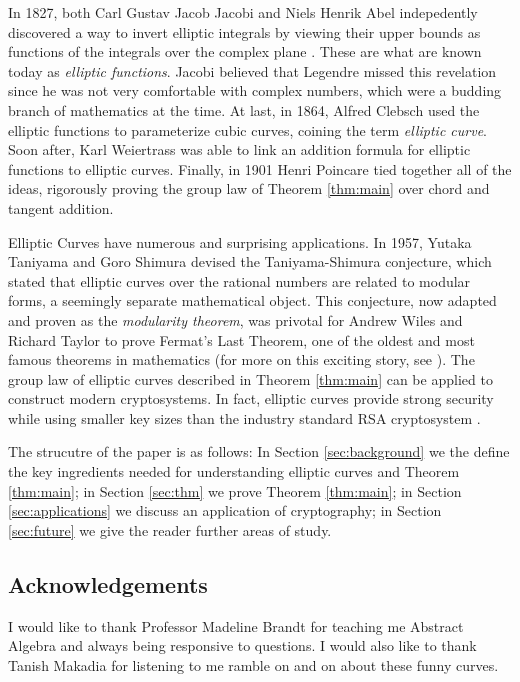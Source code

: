 \documentclass[]{../../math_paper}
\begin{document}
In 1827, both Carl Gustav Jacob Jacobi and Niels Henrik Abel indepedently discovered a way to invert elliptic integrals by viewing their upper bounds as functions of the integrals over the complex plane\cite{jacobi1829fundamenta} \cite{abel}. These are what are known today as \emph{elliptic functions}. Jacobi believed that Legendre missed this revelation since he was not very comfortable with complex numbers, which were a budding branch of mathematics at the time. At last, in 1864, Alfred Clebsch used the elliptic functions to parameterize cubic curves, coining the term \emph{elliptic curve}. Soon after, Karl Weiertrass was able to link an addition formula for elliptic functions to elliptic curves. Finally, in 1901 Henri Poincare tied together all of the ideas, rigorously proving the group law of Theorem \ref{thm:main} over chord and tangent addition\cite{H1901}.

Elliptic Curves have numerous and surprising applications. In 1957, Yutaka Taniyama and Goro Shimura devised the Taniyama-Shimura conjecture, which stated that elliptic curves over the rational numbers are related to modular forms, a seemingly separate mathematical object. This conjecture, now adapted and proven as the \emph{modularity theorem}, was privotal for Andrew Wiles and Richard Taylor to prove Fermat's Last Theorem, one of the oldest and most famous theorems in mathematics (for more on this exciting story, see \cite{singh1998fermat}). The group law of elliptic curves described in Theorem \ref{thm:main} can be applied to construct modern cryptosystems. In fact, elliptic curves provide strong security while using smaller key sizes than the industry standard RSA cryptosystem \cite{stein2008elementary}.

The strucutre of the paper is as follows: In Section \ref{sec:background} we the define the key ingredients needed for understanding elliptic curves and Theorem \ref{thm:main}; in Section \ref{sec:thm} we prove Theorem \ref{thm:main}; in Section \ref{sec:applications} we discuss an application of cryptography; in Section \ref{sec:future} we give the reader further areas of study.

\subsection*{Acknowledgements}
I would like to thank Professor Madeline Brandt for teaching me Abstract Algebra and always being responsive to questions. I would also like to thank Tanish Makadia for listening to me ramble on and on about these funny curves.
\end{document}
